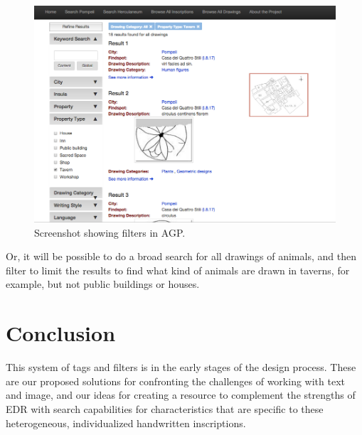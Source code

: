 \documentclass[amsthm,ebook]{saparticle}
\begin{document}
\begin{figure}[!hbp]
\centering
 \includegraphics[width=0.9\columnwidth]{EAGLE2016BenefielSypniewski-img009.png}
\caption{Screenshot showing filters in AGP.}
\label{fig:9}
\end{figure}


Or, it will be possible to do a broad search for all drawings of animals, and then filter to limit the results to find
what kind of animals are drawn in taverns, for example, but not public buildings or houses. 




\section{Conclusion}


\noindent  This system of tags and filters is in the early stages of the design process. These are our proposed solutions for
confronting the challenges of working with text and image, and our ideas for creating a resource to complement the
strengths of EDR with search capabilities for characteristics that are specific to these heterogeneous, individualized
handwritten inscriptions. 

\nocite{wallace-hadrill_herculaneum:_2011}
\nocite{vivolo_pompei:_1993}
\nocite{guadagno_supplemento_1978}
\nocite{guadagno_supplemento_1981}
\nocite{della_corte_iscrizioni_1958}



\end{document}
